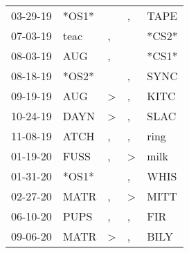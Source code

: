 \begin{supertabular}{lllll}
 03-29-19 &  *OS1* &               &             , &   TAPE \\
 07-03-19 &   teac &             , &               &  *CS2* \\
 08-03-19 &    AUG &             , &               &  *CS1* \\
 08-18-19 &  *OS2* &               &             , &   SYNC \\
 09-19-19 &    AUG &  \textgreater &             , &   KITC \\
 10-24-19 &   DAYN &  \textgreater &             , &   SLAC \\
 11-08-19 &   ATCH &             , &             , &   ring \\
 01-19-20 &   FUSS &             , &  \textgreater &   milk \\
 01-31-20 &  *OS1* &               &             , &   WHIS \\
 02-27-20 &   MATR &             , &  \textgreater &   MITT \\
 06-10-20 &   PUPS &             , &             , &    FIR \\
 09-06-20 &   MATR &  \textgreater &             , &   BILY \\
\end{supertabular}
